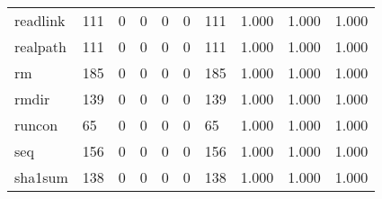 \begin{longtable}{lp{2.0cm}p{2.0cm}p{2.0cm}p{2.0cm}p{2.0cm}p{2.0cm}p{2.0cm}p{2.0cm}p{2.0cm}}
readlink  &                    111 &                                             0 &                                            0 &                                           0 &                                            0 &                                        111 &                                1.000 &                                  1.000 &                                1.000 \\
realpath  &                    111 &                                             0 &                                            0 &                                           0 &                                            0 &                                        111 &                                1.000 &                                  1.000 &                                1.000 \\
rm        &                    185 &                                             0 &                                            0 &                                           0 &                                            0 &                                        185 &                                1.000 &                                  1.000 &                                1.000 \\
rmdir     &                    139 &                                             0 &                                            0 &                                           0 &                                            0 &                                        139 &                                1.000 &                                  1.000 &                                1.000 \\
runcon    &                     65 &                                             0 &                                            0 &                                           0 &                                            0 &                                         65 &                                1.000 &                                  1.000 &                                1.000 \\
seq       &                    156 &                                             0 &                                            0 &                                           0 &                                            0 &                                        156 &                                1.000 &                                  1.000 &                                1.000 \\
sha1sum   &                    138 &                                             0 &                                            0 &                                           0 &                                            0 &                                        138 &                                1.000 &                                  1.000 &                                1.000 \\

\end{longtable}

